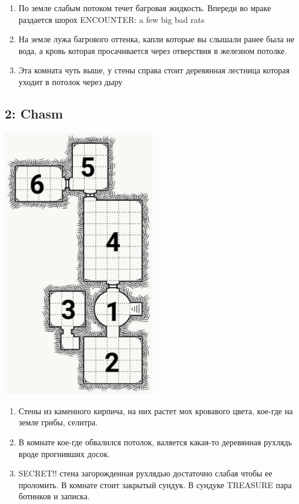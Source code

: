 \documentclass[a5paper,11pt]{book}
\begin{document}
\begin{multicols}{2}
\begin{enumerate}
\item По земле слабым потоком течет багровая жидкость. Впереди во мраке раздается шорох ENCOUNTER: a few big bad rats
\item На земле лужа багрового оттенка, капли которые вы слышали ранее была не вода, а кровь которая просачивается через отверствия в железном потолке.
\item Эта комната чуть выше, у стены справа стоит деревянная лестница которая уходит в потолок через дыру
\end{enumerate}

\subsection{2: Chasm}

\includegraphics[width=0.5\textwidth]{2}

\begin{enumerate}
\item Стены из каменного кирпича, на них растет мох кровавого цвета, кое-где на земле грибы, селитра.
\item В комнате кое-где обвалился потолок, валяется какая-то деревянная рухлядь вроде прогнивших досок.
\item SECRET!! стена загорожденная рухлядью достаточно слабая чтобы ее проломить. В комнате стоит закрытый сундук. В сундуке TREASURE пара ботинков и записка. 


\end{enumerate}
\end{multicols}
\end{document}
